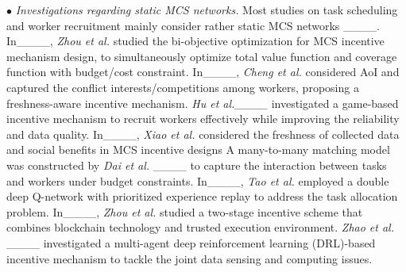 \noindent
$\bullet$ \textit{Investigations regarding static MCS networks.} Most studies on task scheduling and worker recruitment mainly consider rather static MCS networks ____.
In____, \textit{Zhou et al.} studied the bi-objective optimization for MCS incentive mechanism design, to simultaneously optimize total value function and coverage function with budget/cost constraint.
In____, \textit{Cheng et al.} considered AoI and captured the conflict interests/competitions among workers, proposing a freshness-aware incentive mechanism.
\textit{Hu et al.____} investigated a game-based incentive mechanism to recruit workers effectively while improving the reliability and data quality.
In____, \textit{Xiao et al.} considered the freshness of collected data and social benefits in MCS incentive designs
A many-to-many matching model was constructed by \textit{Dai et al.} ____ to capture the interaction between tasks and workers under budget constraints.
In____, \textit{Tao et al.} employed a double deep Q-network with prioritized experience replay to address the task allocation problem.
In____, \textit{Zhou et al.} studied a two-stage incentive scheme that combines blockchain technology and trusted execution environment.
\textit{Zhao et al.} ____ investigated a multi-agent deep reinforcement learning (DRL)-based incentive mechanism to tackle the joint data sensing and computing issues.


